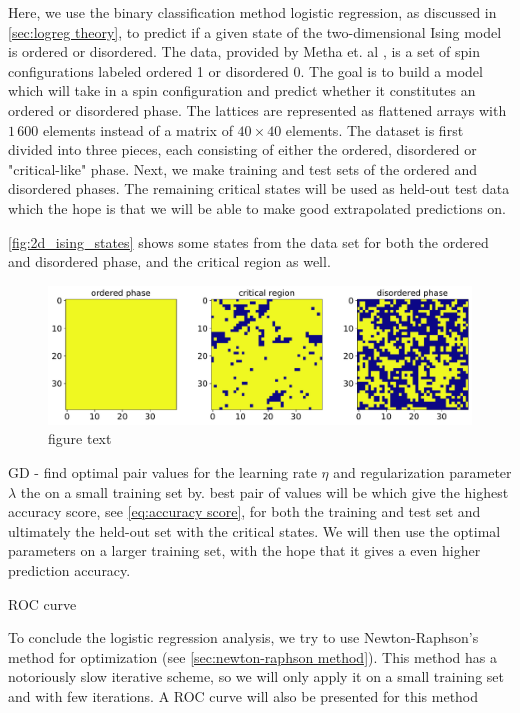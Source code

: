 Here, we use the binary classification method logistic regression, as discussed in \autoref{sec:logreg theory}, to predict if a given state of the two-dimensional Ising model is ordered or disordered. The data, provided by Metha et. al \cite{Mehta_2019}, is a set of spin configurations labeled ordered 1 or disordered 0. The goal is to build a model which will take in a spin configuration and predict whether it constitutes an ordered or disordered phase. The lattices are represented as flattened arrays with $1\,600$ elements instead of a matrix of $40 \times 40$ elements. The dataset is first divided into three pieces, each consisting of either the ordered, disordered or "critical-like" phase. Next, we make training and test sets of the ordered and disordered phases. The remaining critical states will be used as held-out test data which the hope is that we will be able to make good extrapolated predictions on.

\autoref{fig:2d_ising_states} shows some states from the data set for both the ordered and disordered phase, and the critical region as well. 

\begin{figure}[H]
\begin{center}\includegraphics[scale=0.5]{latex/figures/ising_states.pdf}
\end{center}
\caption{figure text}
\label{fig:2d_ising_states}
\end{figure}

GD - find optimal pair values for the learning rate $\eta$ and regularization parameter $\lambda$ the on a small training set by. best pair of values will be which give the highest accuracy score, see \autoref{eq:accuracy score}, for both the training and test set and ultimately the held-out set with the critical states. We will then use the optimal parameters on a larger training set, with the hope that it gives a even higher prediction accuracy.

ROC curve


To conclude the logistic regression analysis, we try to use Newton-Raphson's method for optimization (see \autoref{sec:newton-raphson method}). This method has a notoriously slow iterative scheme, so we will only apply it on a small training set and with few iterations. A ROC curve will also be presented for this method

